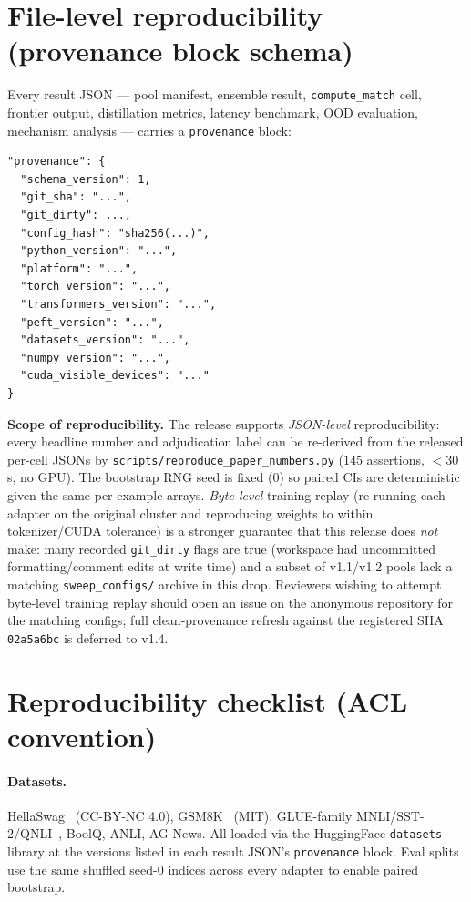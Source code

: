 \documentclass[11pt]{article}
\begin{document}
\section{File-level reproducibility (provenance block schema)}\label{app:provenance}
Every result JSON --- pool manifest, ensemble result, \texttt{compute\_match} cell, frontier output, distillation metrics, latency benchmark, OOD evaluation, mechanism analysis --- carries a \texttt{provenance} block:
{\footnotesize
\begin{verbatim}
"provenance": {
  "schema_version": 1,
  "git_sha": "...",
  "git_dirty": ...,
  "config_hash": "sha256(...)",
  "python_version": "...",
  "platform": "...",
  "torch_version": "...",
  "transformers_version": "...",
  "peft_version": "...",
  "datasets_version": "...",
  "numpy_version": "...",
  "cuda_visible_devices": "..."
}
\end{verbatim}}
\textbf{Scope of reproducibility.} The release supports \emph{JSON-level} reproducibility: every headline number and adjudication label can be re-derived from the released per-cell JSONs by \texttt{scripts/\allowbreak reproduce\_\allowbreak paper\_\allowbreak numbers.\allowbreak py} ($145$ assertions, ${<}30$\,s, no GPU). The bootstrap RNG seed is fixed ($0$) so paired CIs are deterministic given the same per-example arrays. \emph{Byte-level} training replay (re-running each adapter on the original cluster and reproducing weights to within tokenizer/CUDA tolerance) is a stronger guarantee that this release does \emph{not} make: many recorded \texttt{git\_dirty} flags are true (workspace had uncommitted formatting/comment edits at write time) and a subset of v1.1/v1.2 pools lack a matching \texttt{sweep\_configs/} archive in this drop. Reviewers wishing to attempt byte-level training replay should open an issue on the anonymous repository for the matching configs; full clean-provenance refresh against the registered SHA \texttt{02a5a6bc} is deferred to v1.4.

\section{Reproducibility checklist (ACL convention)}\label{app:repro}
\paragraph{Datasets.} HellaSwag~\citep{zellers2019hellaswag} (CC-BY-NC 4.0), GSM8K~\citep{cobbe2021gsm8k} (MIT), GLUE-family MNLI/SST-2/QNLI~\citep{wang2018glue}, BoolQ, ANLI, AG News. All loaded via the HuggingFace \texttt{datasets} library at the versions listed in each result JSON's \texttt{provenance} block. Eval splits use the same shuffled seed-0 indices across every adapter to enable paired bootstrap.
\end{document}
